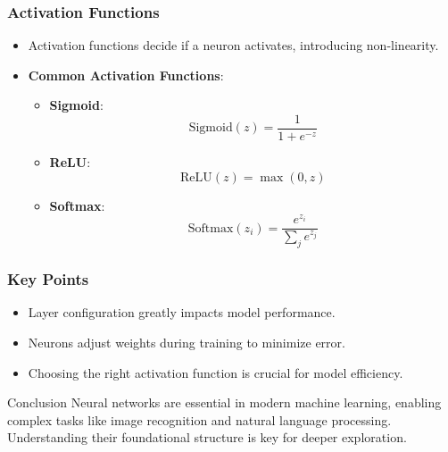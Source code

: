 \documentclass[aspectratio=169]{beamer}
\begin{document}
\begin{frame}[fragile]
    \frametitle{Activation Functions}
    \begin{itemize}
        \item Activation functions decide if a neuron activates, introducing non-linearity.
        
        \item \textbf{Common Activation Functions}:
            \begin{itemize}
                \item \textbf{Sigmoid}: 
                \begin{equation}
                    \text{Sigmoid}(z) = \frac{1}{1 + e^{-z}}
                \end{equation}
                \item \textbf{ReLU}:
                \begin{equation}
                    \text{ReLU}(z) = \max(0, z)
                \end{equation}
                \item \textbf{Softmax}:
                \begin{equation}
                    \text{Softmax}(z_i) = \frac{e^{z_i}}{\sum_{j} e^{z_j}}
                \end{equation}
            \end{itemize}
    \end{itemize}
\end{frame}

\begin{frame}[fragile]
    \frametitle{Key Points}
    \begin{itemize}
        \item Layer configuration greatly impacts model performance.
        \item Neurons adjust weights during training to minimize error.
        \item Choosing the right activation function is crucial for model efficiency.
    \end{itemize}
    \begin{block}{Conclusion}
        Neural networks are essential in modern machine learning, enabling complex tasks like image recognition and natural language processing. Understanding their foundational structure is key for deeper exploration.
    \end{block}
\end{frame}
\end{document}
